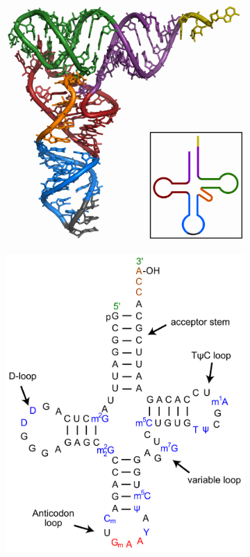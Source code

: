 \begin{figure}
     \centering
     \begin{subfigure}[b]{0.4\textwidth}
         \centering
         \includegraphics[width=\textwidth]{figures/chap4/TRNA-Phe_yeast_1ehz.png}
         \caption{}
         \label{fig:tRNA_3d_struct}
     \end{subfigure}
     \hfill
     \begin{subfigure}[b]{0.3\textwidth}
         \centering
         \includegraphics[width=\textwidth]{figures/chap4/TRNA-Phe_yeast_en.png}

\end{subfigure}
\end{figure}
